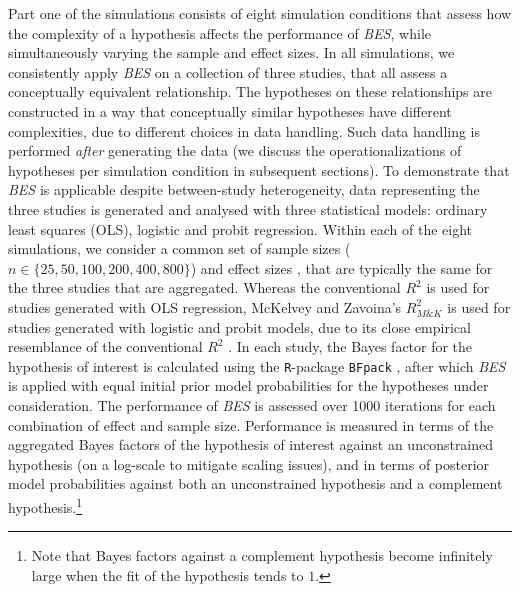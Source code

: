 \documentclass[
  authoryear,
  preprint,
  5p,
  twocolumn]{elsarticle}
\begin{document}
Part one of the simulations consists of eight simulation conditions that
assess how the complexity of a hypothesis affects the performance of
\emph{BES}, while simultaneously varying the sample and effect sizes. In
all simulations, we consistently apply \emph{BES} on a collection of
three studies, that all assess a conceptually equivalent relationship.
The hypotheses on these relationships are constructed in a way that
conceptually similar hypotheses have different complexities, due to
different choices in data handling. Such data handling is performed
\emph{after} generating the data (we discuss the operationalizations of
hypotheses per simulation condition in subsequent sections). To
demonstrate that \emph{BES} is applicable despite between-study
heterogeneity, data representing the three studies is generated and
analysed with three statistical models: ordinary least squares (OLS),
logistic and probit regression. Within each of the eight simulations, we
consider a common set of sample sizes
(\(n \in \{25, 50, 100, 200, 400, 800\}\)) and effect sizes
\citep[\(R^2 \in \{0.02, 0.09, 0.25\}\), corresponding to small, medium
and large effects as defined by][]{cohen_1988}, that are typically the
same for the three studies that are aggregated. Whereas the conventional
\(R^2\) is used for studies generated with OLS regression, McKelvey and
Zavoina's \(R^2_{M\&K}\) \citeyearpar{mckelvey_zavoina_1975} is used for
studies generated with logistic and probit models, due to its close
empirical resemblance of the conventional \(R^2\)
\citep{hagle_mitchell_goodness_1992, demaris_explained_2002}. In each
study, the Bayes factor for the hypothesis of interest is calculated
using the \texttt{R}-package \texttt{BFpack} \citep{BFpack}, after which
\emph{BES} is applied with equal initial prior model probabilities for
the hypotheses under consideration. The performance of \emph{BES} is
assessed over 1000 iterations for each combination of effect and sample
size. Performance is measured in terms of the aggregated Bayes factors
of the hypothesis of interest against an unconstrained hypothesis (on a
log-scale to mitigate scaling issues), and in terms of posterior model
probabilities against both an unconstrained hypothesis and a complement
hypothesis.\footnote{Note that Bayes factors against a complement
  hypothesis become infinitely large when the fit of the hypothesis
  tends to \(1\).}
\end{document}

